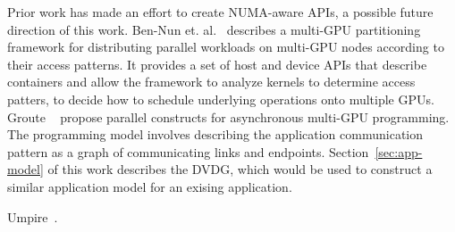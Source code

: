 Prior work has made an effort to create NUMA-aware APIs, a possible future direction of this work.
Ben-Nun et. al.~\cite{ben2015memory} describes a multi-GPU partitioning framework for distributing parallel workloads on multi-GPU nodes according to their access patterns.
It provides a set of host and device APIs that describe containers and allow the framework to analyze kernels to determine access patters, to decide how to schedule underlying operations onto multiple GPUs.
Groute ~\cite{ben2017groute} propose parallel constructs for asynchronous multi-GPU programming.
The programming model involves describing the application communication pattern as a graph of communicating links and endpoints.
Section~\ref{sec:app-model} of this work describes the DVDG, which would be used to construct a similar application model for an exising application.

Umpire~\cite{beckingsale2018umpire}.
